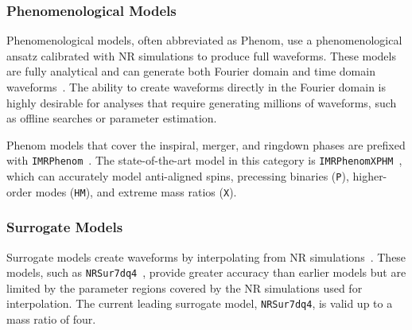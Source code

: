 \subsubsection{Phenomenological Models}

Phenomenological models, often abbreviated as Phenom, use a phenomenological ansatz calibrated with NR simulations to produce full waveforms. These models are fully analytical and can generate both Fourier domain and time domain waveforms~\cite{IMR_1:2007, IMR_2:2020}. The ability to create waveforms directly in the Fourier domain is highly desirable for analyses that require generating millions of waveforms, such as offline searches or parameter estimation.

Phenom models that cover the inspiral, merger, and ringdown phases are prefixed with \verb|IMRPhenom|~\cite{IMRPhenomD:2009}. The state-of-the-art model in this category is \verb|IMRPhenomXPHM|~\cite{IMRPhenomXPHM:2020}, which can accurately model anti-aligned spins, precessing binaries (\verb|P|), higher-order modes (\verb|HM|), and extreme mass ratios (\verb|X|).

\subsubsection{Surrogate Models}

Surrogate models create waveforms by interpolating from NR simulations~\cite{Surr_1:2019, Surr_2:2022}. These models, such as \verb|NRSur7dq4|~\cite{NRSur7dq4:2019}, provide greater accuracy than earlier models but are limited by the parameter regions covered by the NR simulations used for interpolation. The current leading surrogate model, \verb|NRSur7dq4|, is valid up to a mass ratio of four.
